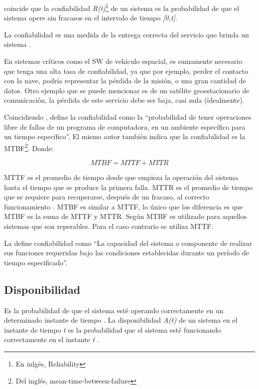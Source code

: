 \cite{FTDesign} coincide que la confiabilidad \textit{R(t)}\footnote{En inlgés, Reliability} de un
sistema es la probabilidad de que el sistema opere sin fracasos en el intervalo de tiempo
\textit{[0,t]}.

La confiabilidad es una medida de la entrega correcta del servicio que brinda un sistema
\citep{FTDesign}.

En sistemas críticos como el \ac{SW} de vehículo espacial, es sumamente necesario que tenga una
alta tasa de confiabilidad, ya que por ejemplo, perder el contacto con la nave, podría representar
la pérdida de la misión, o una gran cantidad de datos. Otro ejemplo que se puede mencionar es de un
satélite geoestacionario de comunicación, la pérdida de este servicio debe ser baja, casi nula
(idealmente).

Coincidiendo \cite{pressman01}, define la confiabilidad como la ``probabilidad de tener operaciones
libre de fallas de un programa de computadora, en un ambiente específico para un tiempo
específico''. El mismo autor también indica que la confiabilidad es la \ac{MTBF}\footnote{Del
inglés, mean-time-between-failure}. Donde:

$$MTBF = MTTF + MTTR$$

\ac{MTTF} es el promedio de tiempo desde que empieza la operación del sistema hasta el tiempo que
se produce la primera falla. \ac{MTTR} es el promedio de tiempo que se requiere para recuperarse,
después de un fracaso, al correcto funcionamiento \citep{Hanmer07}. \ac{MTBF}  es similar a
\ac{MTTF}, lo único que los diferencia es que \ac{MTBF} es la suma de \ac{MTTF} y \ac{MTTR}. Según
\cite{Hanmer07} \ac{MTBF} es utilizado para aquellos sistemas que son reperables. Para el caso
contrario se utiliza \ac{MTTF}.

La \cite{IEEE610.12} define confiabilidad como ``La capacidad del sistema o componente de realizar
sus funciones requeridas bajo las condiciones establecidas durante un período de tiempo
especificado''.

\subsection{Disponibilidad}\label{subsec:disponibilidad}
Es la probabilidad de que el sistema esté operando correctamente en un determinado instante de
tiempo \citep{SoftwareFaultToleranceATutorial}. La disponibilidad \textit{A(t)} de un sistema en el
instante de tiempo \textit{t} es la probabilidad que el sistema esté funcionando correctamente en
el instante \textit{t} \citep{FTDesign}.


